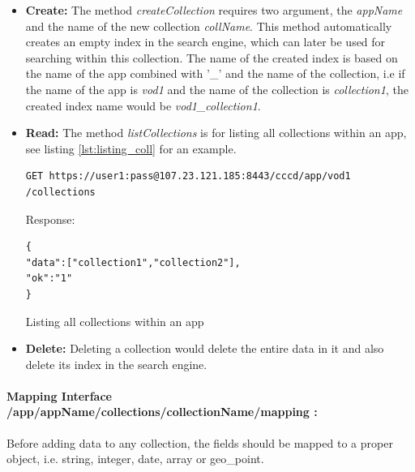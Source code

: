 
\begin{itemize}
\item \textbf{Create:} The method \textit{createCollection} requires two argument, the \textit{appName} and the name of the new collection \textit{collName}. This method automatically creates an empty index in the search engine, which can later be used for searching within this collection. The name of the created index is based on the name of the app combined with '\_' and the name of the collection, i.e if the name of the app is \textit{vod1} and the name of the collection is \textit{collection1}, the created index name would be \textit{vod1\_collection1}.

\item \textbf{Read:} The method \textit{listCollections} is for listing all collections within an app, see listing \ref{lst:listing_coll} for an example.

\begin{code}
\begin{verbatim}
GET https://user1:pass@107.23.121.185:8443/cccd/app/vod1
/collections
\end{verbatim}
Response:
\begin{verbatim}
{
"data":["collection1","collection2"],
"ok":"1"
}
\end{verbatim}
\caption{Listing all collections within an app}
\label{lst:listing_coll}
\end{code}

\item \textbf{Delete:} Deleting a collection would delete the entire data in it and also delete its index in the search engine. %
\end{itemize}

\paragraph{Mapping Interface /app/{appName}/collections/{collectionName}/mapping :\label{sec:des_rest_api_mapping}} Before adding data to any collection, the fields should be mapped to a proper object, i.e. string, integer, date, array or geo\_point. 

